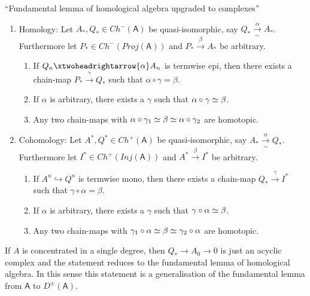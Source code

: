 \documentclass[fontsize=11pt,fleqn,a4paper]{scrartcl}
\begin{document}
\begin{lemma}
\enquote{Fundamental lemma of homological algebra upgraded to complexes}

\begin{multicols}{2}
\begin{enumerate}
\item Homology: Let $A_\ast,Q_\ast \in Ch^-(\mathsf{A})$ be quasi-isomorphic, say $Q_\ast \xrightarrow[\sim]{\alpha} A_\ast$. Furthermore let $P_\ast\in Ch^-(Proj(\mathsf{A}))$ and $P_\ast \xrightarrow{\beta} A_\ast$ be arbitrary.

\begin{enumerate}
\item If $Q_n \xtwoheadrightarrow{\alpha} A_n$ is termwise epi, then there exists a chain-map $P_\ast \xrightarrow{\gamma} Q_\ast$ such that $\alpha\circ\gamma = \beta$.
\item If $\alpha$ is arbitrary, there exists a $\gamma$ such that $\alpha\circ\gamma \simeq \beta$.
\item Any two chain-maps with $\alpha\circ\gamma_1\simeq\beta\simeq\alpha\circ\gamma_2$ are homotopic.
\end{enumerate}

\item Cohomology: Let $A^\ast,Q^\ast \in Ch^+(\mathsf{A})$ be quasi-isomorphic, say $A_\ast \xrightarrow[\sim]{\alpha} Q_\ast$. Furthermore let $I^\ast\in Ch^+(Inj(\mathsf{A}))$ and $A^\ast \xrightarrow{\beta} I^\ast$ be arbitrary.

\begin{enumerate}
\item If $A^n \hookrightarrow Q^n$ is termwise mono, then there exists a chain-map $Q_\ast \xrightarrow{\gamma} I^\ast $ such that $\gamma\circ\alpha = \beta$.
\item If $\alpha$ is arbitrary, there exists a $\gamma$ such that $\gamma\circ\alpha\simeq \beta$.
\item Any two chain-maps with $\gamma_1\circ\alpha\simeq\beta\simeq\gamma_2\circ\alpha$ are homotopic.
\end{enumerate}
\end{enumerate}
\end{multicols}
\end{lemma}
\begin{remark}
If $A$ is concentrated in a single degree, then $Q_\ast \to A_0\to 0$ is just an acyclic complex and the statement reduces to the fundamental lemma of homological algebra. In this sense this statement is a generalisation of the fundamental lemma from $\mathsf{A}$ to $D^\pm(\mathsf{A})$.
\end{remark}
\end{document}
